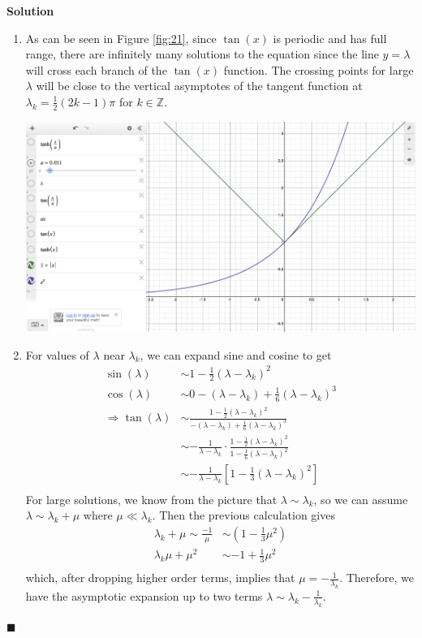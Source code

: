 \documentclass[11pt]{article}
\theoremstyle{problemstyle}
\newenvironment{solution}
  {\noindent\textbf{Solution}\quad}
  {\hfill$\blacksquare$\par\vspace{1em}}
\begin{document}
\begin{solution}
  \begin{enumerate}
    \item As can be seen in Figure \ref{fig:21}, since $\tan(x)$ is periodic and has
      full range, there are infinitely many solutions to the equation since the
      line $y = \lambda$ will cross each branch of the $\tan(x)$ function. The
      crossing points for large $\lambda$ will be close to the vertical asymptotes
      of the tangent function at $\lambda_k = \frac{1}{2}(2k-1)\pi$ for $k \in \mathbb{Z}$.
      \begin{center}
        \includegraphics[width=.80\textwidth]{19.png}
        \label{fig:21}
      \end{center}
    \item For values of $\lambda$ near $\lambda_k$, we can expand sine and
      cosine to get
      \begin{align*}
        \sin(\lambda) & \sim 1 - \frac{1}{2}(\lambda - \lambda_k)^2 \\
        \cos(\lambda) & \sim 0 - (\lambda - \lambda_k) + \frac{1}{6}(\lambda -
          \lambda_k)^3 \\
        \Rightarrow \tan(\lambda) & \sim \frac{1 - \frac{1}{2}(\lambda -
          \lambda_k)^2}{-(\lambda - \lambda_k) + \frac{1}{6}(\lambda -
          \lambda_k)^3} \\
            & \sim -\frac{1}{\lambda - \lambda_k} \cdot \frac{1 - \frac{1}{2}(\lambda
              - \lambda_k)^2}{1 - \frac{1}{6}(\lambda -
              \lambda_k)^2} \\
            & \sim -\frac{1}{\lambda - \lambda_k} \left[ 1 - \frac{1}{3}(\lambda -
              \lambda_k)^2 \right] \\
      \end{align*}
      For large solutions, we know from the picture that $\lambda \sim
      \lambda_k$, so we can assume $\lambda \sim \lambda_k + \mu$ where $\mu \ll
      \lambda_k$. Then the previous calculation gives 
      \begin{align*}
        \lambda_k + \mu \sim \frac{-1}{\mu} & \sim (1 - \frac{1}{3}\mu^2) \\
        \lambda_k\mu + \mu^2 & \sim -1 + \frac{1}{3}\mu^2 \\
      \end{align*}
      which, after dropping higher order terms, implies that $\mu =
      -\frac{1}{\lambda_k}$. Therefore, we have the asymptotic expansion up to
      two terms $\lambda \sim \lambda_k - \frac{1}{\lambda_k}$.


  \end{enumerate}
\end{solution}
\end{document}
